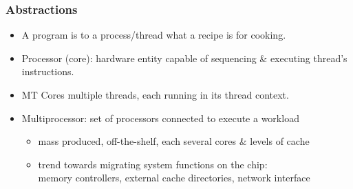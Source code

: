 \documentclass{beamer}
\newcommand{\emp}[1]{\textcolor{DikuRed}{ #1}}
\begin{document}
\begin{frame}[fragile,t]
\frametitle{Abstractions}
\medskip

\begin{itemize}
    \item A \emp{program} is to a \emp{process/thread} 
            what a recipe is for cooking.\smallskip

    \item \emp{Processor (core)}: hardware entity capable of
            sequencing \& executing thread's instructions.\smallskip

    \item \emp{MT Cores} multiple threads, each 
            running in its thread context.\smallskip

    \item \emp{Multiprocessor:} set of processors connected to execute a workload
        \begin{itemize}
            \item mass produced, off-the-shelf, each several cores \& levels of cache
            \item trend towards migrating system functions on the chip:\\
                    memory controllers, external cache directories, network interface
        \end  {itemize}
\end{itemize}


\end{frame}
\end{document}
